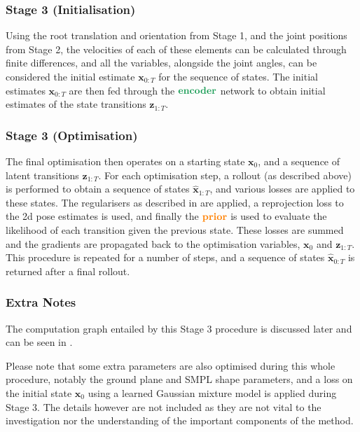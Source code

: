 \subsubsection{Stage 3 (Initialisation)}
Using the root translation and orientation from Stage 1, and the joint positions from Stage 2, the velocities of each of these elements can be calculated through finite differences, and all the variables, alongside the joint angles, can be considered the initial estimate $\mathbf{x}_{0:T}$ for the sequence of states. The initial estimates $\mathbf{x}_{0:T}$ are then fed through the $\textbf{\textcolor{ForestGreen}{encoder}}$ network to obtain initial estimates of the state transitions $\textbf{z}_{1:T}$.

\subsubsection{Stage 3 (Optimisation)}
The final optimisation then operates on a starting state $\mathbf{x}_0$, and a sequence of latent transitions $\textbf{z}_{1:T}$. For each optimisation step, a rollout (as described above) is performed to obtain a sequence of states $\mathbf{\hat{x}}_{1:T}$, and various losses are applied to these states. The regularisers as described in  are applied, a reprojection loss to the 2d pose estimates is used, and finally the $\textbf{\textcolor{orange}{prior}}$ is used to evaluate the likelihood of each transition given the previous state. These losses are summed and the gradients are propagated back to the optimisation variables, $\mathbf{x}_0$ and $\textbf{z}_{1:T}$. This procedure is repeated for a number of steps, and a sequence of states $\mathbf{\hat{x}}_{0:T}$ is returned after a final rollout.


\subsubsection{Extra Notes}
\label{sec:humor_testops_extra_notes}

The computation graph entailed by this Stage 3 procedure is discussed later and can be seen in .

Please note that some extra parameters are also optimised during this whole procedure, notably the ground plane and SMPL shape parameters, and a loss on the initial state $\mathbf{x}_0$ using a learned Gaussian mixture model is applied during Stage 3. The details however are not included as they are not vital to the investigation nor the understanding of the important components of the method.